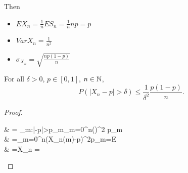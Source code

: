 \begin{exercise}
	Then
	\begin{itemize}
		\item $EX_{n}=\frac{1}{n}ES_n=\frac{1}{n}np=p$
		\item $VarX_{n}=\frac{1}{n^{2}}$
		\item $\sigma_{X_{n}}=\sqrt{\frac{np(1-p)}{n}}$
	\end{itemize}
	\begin{prop}
		For all $\delta>0$, $p \in [0,1]$, $n \in \mathbb{N}$,
		\[
			P(\left|X_n -p\right|>\delta)\le \frac{1}{\delta^2}\frac{p(1-p)}{n}
			.\]
		\begin{proof}
			\begin{flalign*}
				 & = \sum_{m:\left|-p\right|>\delta }{p_{m}}\le \sum_{m=0}^{n}{\left(\right)^2 p_m } \\
				           & =\sum_{m=0}^{n}{\left(X_{n}(m)-p\right)^{2}p_m}=E     \\
				           & =X_n = 
			\end{flalign*}
		\end{proof}
	\end{prop}
\end{exercise}


